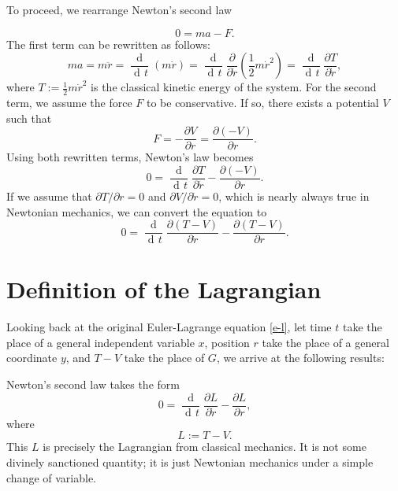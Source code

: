 \documentclass[prb,preprint]{revtex4-1}
\DeclareMathOperator{\dd}{d\!}
\DeclareMathOperator{\ddd}{\mathrm{d}}
\begin{document}
To proceed, we rearrange Newton's second law

\begin{equation}
0 = ma - F.
\end{equation}
The first term can be rewritten as follows:
\begin{equation}
ma = m \ddot{r} = \frac{\ddd}{\dd t} (m \dot{r})
= \frac{\ddd}{\dd t} \frac{\partial}{\partial \dot{r}} \left(\frac{1}{2} m \dot{r}^2 \right)
= \frac{\ddd}{\dd t} \frac{\partial T}{\partial \dot{r}},
\end{equation}
where $T:=\frac{1}{2} m \dot{r}^2$ is the classical kinetic energy of the system. For the second term, we assume the force $F$ to be conservative. If so, there exists a potential $V$ such that
\begin{equation}
F = - \frac{\partial V}{\partial r} = \frac{\partial (-V)}{\partial r}.
\end{equation}
Using both rewritten terms, Newton's law becomes
\begin{equation}
0 = \frac{\ddd}{\dd t} \frac{\partial T}{\partial \dot{r}} - \frac{\partial (-V)}{\partial r}.
\end{equation}
If we assume that $\partial T/ \partial r = 0$ and $\partial V / \partial \dot{r} = 0$, which is nearly always true in Newtonian mechanics, we can convert the equation to
\begin{equation}
0 = \frac{\ddd}{\dd t} \frac{\partial (T-V)}{\partial \dot{r}} - \frac{\partial (T-V)}{\partial r}.
\end{equation}

\section{Definition of the Lagrangian}\label{lagrangian-def} %

Looking back at the original Euler-Lagrange equation \eqref{e-l}, let time $t$ take the place of a general independent variable $x$, position $r$ take the place of a general coordinate $y$, and $T-V$ take the place of $G$, we arrive at the following results:

Newton's second law takes the form
\begin{equation}
0 = \frac{\ddd}{\dd t} \frac{\partial L}{\partial \dot{r}} - \frac{\partial L}{\partial r},
\end{equation}
where
\begin{equation}
 L := T-V.
\end{equation}
This $L$ is precisely the Lagrangian from classical mechanics. It is not some divinely sanctioned quantity; it is just Newtonian mechanics under a simple change of variable.
\end{document}
